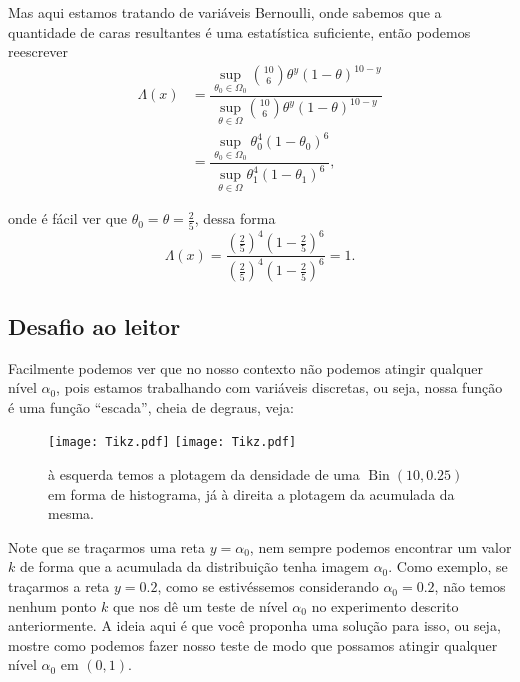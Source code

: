 \documentclass{article}
\begin{document}
Mas aqui estamos tratando de variáveis Bernoulli, onde sabemos que a quantidade de caras resultantes é uma estatística suficiente, então podemos reescrever
\begin{equation*}
    \begin{split}
        \Lambda(x) & = \dfrac{\sup_{\theta_0 \in \Omega_0} \binom{10}{6} \theta^y(1 - \theta)^{10 - y}}{\sup_{\theta \in \Omega} \binom{10}{6} \theta^y(1 - \theta)^{10 - y}} \\
        & = \dfrac{\sup_{\theta_0 \in \Omega_0} \theta_0^4(1 - \theta_0)^6}{\sup_{\theta \in \Omega} \theta_1^4(1 - \theta_1)^6},
    \end{split}
\end{equation*}

\noindent onde é fácil ver que $\theta_0 = \theta = \frac{2}{5}$, dessa forma
\[\Lambda(x) = \dfrac{\left(\frac{2}{5}\right)^4\left(1 - \frac{2}{5}\right)^6}{\left(\frac{2}{5}\right)^4\left(1 - \frac{2}{5}\right)^6} = 1.\]

















\subsection*{Desafio ao leitor}

Facilmente podemos ver que no nosso contexto não podemos atingir qualquer nível $\alpha_0$, pois estamos trabalhando com variáveis discretas, ou seja, nossa função é uma função ``escada'', cheia de degraus, veja:
\begin{figure}[H]
    \texttt{[image: Tikz.pdf]}
    \texttt{[image: Tikz.pdf]}
    \caption{à esquerda temos a plotagem da densidade de uma $\operatorname{Bin}(10, 0.25)$ em forma de histograma, já à direita a plotagem da acumulada da mesma.}
    \label{gaussianas}
\end{figure}

Note que se traçarmos uma reta $y = \alpha_0$, nem sempre podemos encontrar um valor $k$ de forma que a acumulada da distribuição tenha imagem $\alpha_0$. Como exemplo, se traçarmos a reta $y = 0.2$, como se estivéssemos considerando $\alpha_0 = 0.2$, não temos nenhum ponto $k$ que nos dê um teste de nível $\alpha_0$ no experimento descrito anteriormente. A ideia aqui é que você proponha uma solução para isso, ou seja, mostre como podemos fazer nosso teste de modo que possamos atingir qualquer nível $\alpha_0$ em $(0, 1)$.
\end{document}

